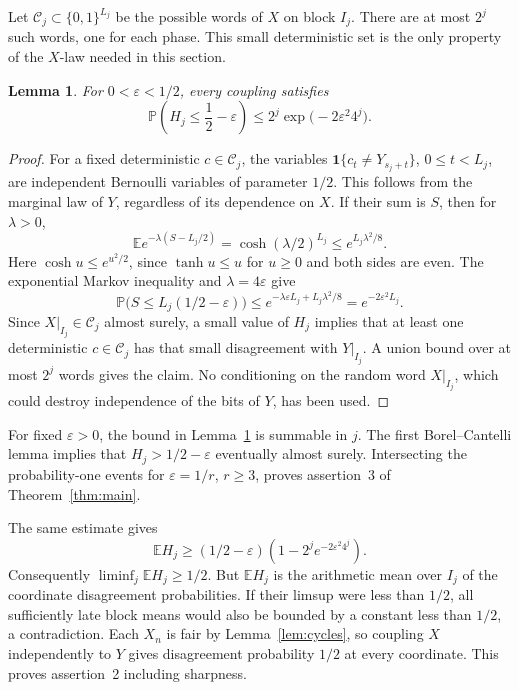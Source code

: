 \documentclass[11pt]{article}
\newtheorem{lemma}{Lemma}
\newcommand{\Prob}{\mathbb P}
\newcommand{\E}{\mathbb E}
\newcommand{\ind}{\mathbf 1}
\begin{document}
Let \(\mathcal C_j\subset\{0,1\}^{L_j}\) be the possible words of \(X\) on block \(I_j\). There are at most \(2^j\) such words, one for each phase. This small deterministic set is the only property of the \(X\)-law needed in this section.

\begin{lemma}\label{lem:concentration}
For \(0<\varepsilon<1/2\), every coupling satisfies
\[
 \Prob\left(H_j\leq\frac12-\varepsilon\right)
 \leq 2^j\exp\big(-2\varepsilon^2 4^j\big).
\]
\end{lemma}
\begin{proof}
For a fixed deterministic \(c\in\mathcal C_j\), the variables
\(\ind\{c_t\ne Y_{s_j+t}\}\), \(0\leq t<L_j\), are independent Bernoulli variables of parameter \(1/2\). This follows from the marginal law of \(Y\), regardless of its dependence on \(X\). If their sum is \(S\), then for \(\lambda>0\),
\[
 \E e^{-\lambda(S-L_j/2)}
 =\cosh(\lambda/2)^{L_j}
 \leq e^{L_j\lambda^2/8}.
\]
Here \(\cosh u\leq e^{u^2/2}\), since \(\tanh u\leq u\) for \(u\geq0\) and both sides are even. The exponential Markov inequality and \(\lambda=4\varepsilon\) give
\[
 \Prob\big(S\leq L_j(1/2-\varepsilon)\big)
 \leq e^{-\lambda\varepsilon L_j+L_j\lambda^2/8}
 =e^{-2\varepsilon^2L_j}.
\]
Since \(X|_{I_j}\in\mathcal C_j\) almost surely, a small value of \(H_j\) implies that at least one deterministic \(c\in\mathcal C_j\) has that small disagreement with \(Y|_{I_j}\). A union bound over at most \(2^j\) words gives the claim. No conditioning on the random word \(X|_{I_j}\), which could destroy independence of the bits of \(Y\), has been used.
\end{proof}

For fixed \(\varepsilon>0\), the bound in Lemma~\ref{lem:concentration} is summable in \(j\). The first Borel--Cantelli lemma implies that \(H_j>1/2-\varepsilon\) eventually almost surely. Intersecting the probability-one events for \(\varepsilon=1/r\), \(r\geq3\), proves assertion~3 of Theorem~\ref{thm:main}.

The same estimate gives
\[
 \E H_j\geq(1/2-\varepsilon)
 \left(1-2^j e^{-2\varepsilon^2 4^j}\right).
\]
Consequently \(\liminf_j\E H_j\geq1/2\). But \(\E H_j\) is the arithmetic mean over \(I_j\) of the coordinate disagreement probabilities. If their limsup were less than \(1/2\), all sufficiently late block means would also be bounded by a constant less than \(1/2\), a contradiction. Each \(X_n\) is fair by Lemma~\ref{lem:cycles}, so coupling \(X\) independently to \(Y\) gives disagreement probability \(1/2\) at every coordinate. This proves assertion~2 including sharpness.
\end{document}
